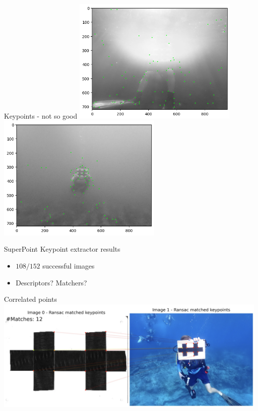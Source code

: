\begin{frame}{Keypoints - not so good}
    \centering
    \includegraphics[height=0.6\textheight,width=0.6\textwidth,keepaspectratio]{images/fs_fail1.png}
    \includegraphics[height=0.6\textheight,width=0.6\textwidth,keepaspectratio]{images/fs_fail2.png}
\end{frame}

\begin{frame}{SuperPoint Keypoint extractor results}
    \begin{itemize}
        \item $108/152$ successful images
        \item Descriptors? Matchers?
    \end{itemize} 
\end{frame}

\begin{frame}{Correlated points}
    \centering
    \includegraphics[height=1\textheight,width=1\textwidth,keepaspectratio]{images/fs_goal.png}
\end{frame}

